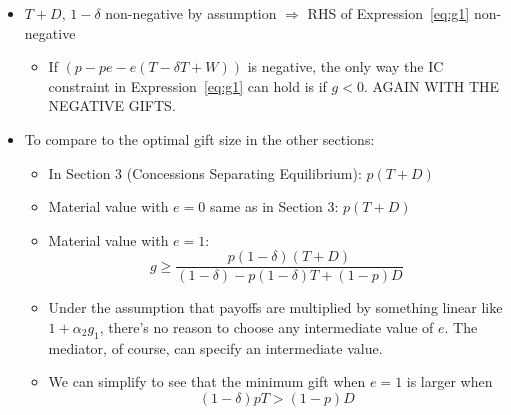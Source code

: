 \documentclass[12pt]{article}
\newcommand{\al}{\alpha}
\newcommand{\de}{\delta}
\begin{document}
\begin{itemize}
\begin{itemize}
\begin{itemize}
							\item $T+D$, $1 - \de $ non-negative by assumption $\Rightarrow$ RHS of Expression~\ref{eq:g1} non-negative
								\begin{itemize}
									\item If $\left(p - pe - e \left( T - \de T + W \right) \right)$ is negative, the only way the IC constraint in Expression~\ref{eq:g1} can hold is if $g<0$. AGAIN WITH THE NEGATIVE GIFTS.
								\end{itemize}
							\item To compare to the optimal gift size in the other sections:
								\begin{itemize}
									\item In Section 3 (Concessions Separating Equilibrium): $p\left(T+D\right)$
									\item Material value with $e=0$ same as in Section 3: $p\left(T+D\right)$
									\item Material value with $e=1$:
										\begin{equation}
											g \geq \frac{p(1-\de)(T + D)}{\left(1-\de \right) -p(1-\de)T +(1-p)D}
											\label{eq:g4}
										\end{equation}
									\item Under the assumption that payoffs are multiplied by something linear like $1 + \al_2 g_1$, there's no reason to choose any intermediate value of $e$. The mediator, of course, can specify an intermediate value.
									\item We can simplify to see that the minimum gift when $e=1$ is larger when
										\[
											(1-\de)pT > (1-p)D
										\]
								\end{itemize}
						\end{itemize}
					

\end{itemize}
\end{itemize}
\end{document}
